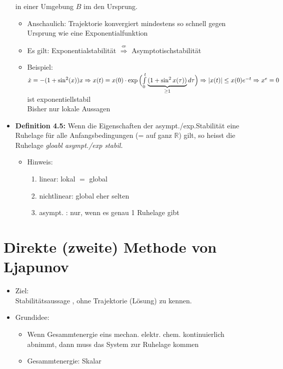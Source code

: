 \documentclass[ngerman]{tudscrreprt}
\begin{document}
\begin{itemize}
\begin{equation*}
\end{equation*}
in einer Umgebung $B$ im den Ursprung.
\begin{itemize}
\item Anschaulich: Trajektorie konvergiert mindestens so schnell gegen Ursprung wie eine Exponentialfunktion
\item Es gilt: Exponentialstabilität $ \stackrel{\nLeftarrow}{\Rightarrow} $ Asymptotischstabilität
\item Beispiel: $\dot x  = -(1+ \sin^2(x)) x\\
\Rightarrow x(t) = x(0) \cdot \exp\Big({ \int \limits_{0}^{t} \underbrace{(1+\sin^2x(\tau))}_{\ge 1}d\tau }\Big)\\
\Rightarrow |x(t)| \le x(0)e^{-t} \\
\Rightarrow x^e = 0
$ ist exponentiellstabil\\
Bisher nur lokale Aussagen
\end{itemize}
\item \textbf{Definition 4.5:} Wenn die Eigenschaften der asympt./exp.Stabilität eine Ruhelage für alle Anfangsbedingungen (= auf ganz $\mathbb{R}$) gilt, so heisst die Ruhelage \textit{gloabl asympt./exp stabil.}
\begin{itemize}
\item Hinweis: 
\begin{enumerate}
\item linear: lokal $=$ global
\item nichtlinear: global eher selten
\item asympt. : nur, wenn es genau 1 Ruhelage gibt 
\begin{figure}[H] 
  \centering 
  \def\svgwidth{350pt} 
   
\end{figure} 
\end{enumerate}
\end{itemize}
\end{itemize}
\section{Direkte (zweite) Methode von Ljapunov}
\begin{itemize}
\item Ziel: \\Stabilitätsaussage , ohne Trajektorie (Lösung) zu kennen.
\item Grundidee: 
\begin{itemize}
\item Wenn Gesammtenergie eins mechan. elektr. chem. kontinuierlich abnimmt, dann muss das System zur Ruhelage kommen
\item Gesammtenergie: Skalar
\end{itemize}
\end{itemize}
\end{document}
